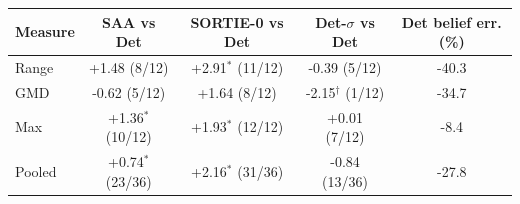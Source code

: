 \begin{tabular}{lcccc}
\toprule
Measure & SAA vs Det & SORTIE-0 vs Det & Det-$\sigma$ vs Det & Det belief err. (\%) \\
\midrule
Range & +1.48 (8/12) & +2.91$^\ast$ (11/12) & -0.39 (5/12) & -40.3 \\
GMD & -0.62 (5/12) & +1.64 (8/12) & -2.15$^\dagger$ (1/12) & -34.7 \\
Max & +1.36$^\ast$ (10/12) & +1.93$^\ast$ (12/12) & +0.01 (7/12) & -8.4 \\
Pooled & +0.74$^\ast$ (23/36) & +2.16$^\ast$ (31/36) & -0.84 (13/36) & -27.8 \\
\bottomrule
\end{tabular}
